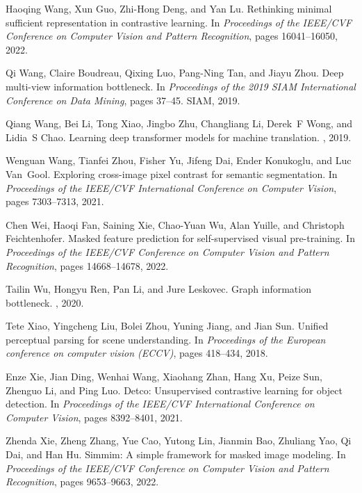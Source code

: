 \documentclass[10pt,twocolumn,letterpaper]{article}
\begin{document}
\begin{thebibliography}{10}
	Haoqing Wang, Xun Guo, Zhi-Hong Deng, and Yan Lu.
	\newblock Rethinking minimal sufficient representation in contrastive learning.
	\newblock In {\em Proceedings of the IEEE/CVF Conference on Computer Vision and
		Pattern Recognition}, pages 16041--16050, 2022.
	
	Qi Wang, Claire Boudreau, Qixing Luo, Pang-Ning Tan, and Jiayu Zhou.
	\newblock Deep multi-view information bottleneck.
	\newblock In {\em Proceedings of the 2019 SIAM International Conference on Data
		Mining}, pages 37--45. SIAM, 2019.
	
	Qiang Wang, Bei Li, Tong Xiao, Jingbo Zhu, Changliang Li, Derek~F Wong, and
	Lidia~S Chao.
	\newblock Learning deep transformer models for machine translation.
	, 2019.
	
	Wenguan Wang, Tianfei Zhou, Fisher Yu, Jifeng Dai, Ender Konukoglu, and Luc
	Van~Gool.
	\newblock Exploring cross-image pixel contrast for semantic segmentation.
	\newblock In {\em Proceedings of the IEEE/CVF International Conference on
		Computer Vision}, pages 7303--7313, 2021.
	
	Chen Wei, Haoqi Fan, Saining Xie, Chao-Yuan Wu, Alan Yuille, and Christoph
	Feichtenhofer.
	\newblock Masked feature prediction for self-supervised visual pre-training.
	\newblock In {\em Proceedings of the IEEE/CVF Conference on Computer Vision and
		Pattern Recognition}, pages 14668--14678, 2022.
	
	Tailin Wu, Hongyu Ren, Pan Li, and Jure Leskovec.
	\newblock Graph information bottleneck.
	, 2020.
	
	Tete Xiao, Yingcheng Liu, Bolei Zhou, Yuning Jiang, and Jian Sun.
	\newblock Unified perceptual parsing for scene understanding.
	\newblock In {\em Proceedings of the European conference on computer vision
		(ECCV)}, pages 418--434, 2018.
	
	Enze Xie, Jian Ding, Wenhai Wang, Xiaohang Zhan, Hang Xu, Peize Sun, Zhenguo
	Li, and Ping Luo.
	\newblock Detco: Unsupervised contrastive learning for object detection.
	\newblock In {\em Proceedings of the IEEE/CVF International Conference on
		Computer Vision}, pages 8392--8401, 2021.
	
	Zhenda Xie, Zheng Zhang, Yue Cao, Yutong Lin, Jianmin Bao, Zhuliang Yao, Qi
	Dai, and Han Hu.
	\newblock Simmim: A simple framework for masked image modeling.
	\newblock In {\em Proceedings of the IEEE/CVF Conference on Computer Vision and
		Pattern Recognition}, pages 9653--9663, 2022.
	

\end{thebibliography}
\end{document}
